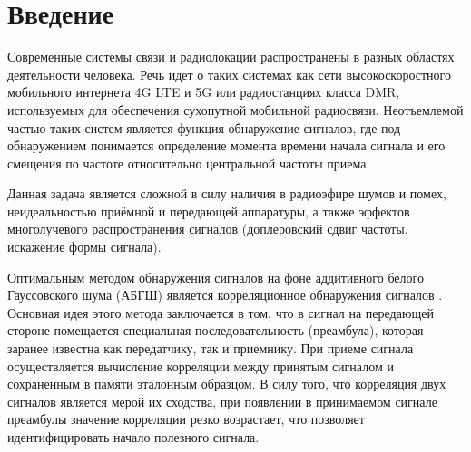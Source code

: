 
\section*{Введение}


Современные системы связи и радиолокации распространены в разных областях деятельности человека. Речь идет о таких системах как сети высокоскоростного мобильного интернета 4G LTE и 5G или радиостанциях класса DMR, используемых для обеспечения сухопутной мобильной радиосвязи. Неотъемлемой частью таких систем является функция обнаружение сигналов, где под обнаружением понимается определение момента времени начала сигнала и его смещения по частоте относительно центральной частоты приема.

Данная задача является сложной в силу наличия в радиоэфире шумов и помех, неидеальностью приёмной и передающей аппаратуры, а также эффектов многолучевого распространения сигналов (доплеровский сдвиг частоты, искажение формы сигнала).

Оптимальным методом обнаружения сигналов на фоне аддитивного белого Гауссовского шума (АБГШ) является корреляционное обнаружения сигналов \cite{grishin_radio_systems}. Основная идея этого метода заключается в том, что в сигнал на передающей стороне помещается специальная последовательность (преамбула), которая заранее известна как передатчику, так и приемнику. При приеме сигнала осуществляется вычисление корреляции между принятым сигналом и сохраненным в памяти эталонным образцом. В силу того, что корреляция двух сигналов является мерой их сходства, при появлении в принимаемом сигнале преамбулы значение корреляции резко возрастает, что позволяет идентифицировать начало полезного сигнала.

